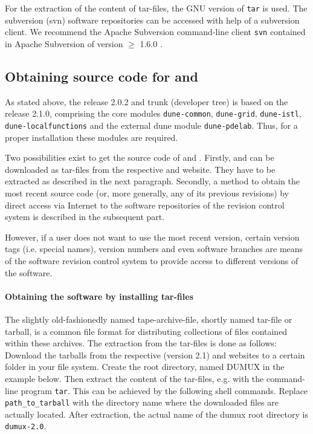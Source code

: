 For the extraction of the content of tar-files, the GNU version of \texttt{tar} is used.
The subversion (svn) software repositories can be accessed with help of a subversion client. We recommend the Apache Subversion command-line client \texttt{svn}
contained in Apache Subversion of version $\geqslant$ 1.6.0 \cite{APACHE-SUBVERSION-HP}. 

\subsection{Obtaining source code for \Dune and \Dumux}
As stated above, the \Dumux release 2.0.2 and trunk (developer tree) is based on the \Dune release 2.1.0, 
comprising the core modules \texttt{dune-common}, \texttt{dune-grid}, \texttt{dune-istl}, \texttt{dune-localfunctions} 
and the external dune module \texttt{dune-pdelab}. Thus, for a proper \Dumux installation these modules are required.

Two possibilities exist to get the source code of \Dune and \Dumux.
Firstly, \Dune and \Dumux can be downloaded as tar-files from the respective {\Dune} and {\Dumux} website. They have to be extracted as described in the next paragraph.
Secondly, a method to obtain the most recent source code (or, more generally, any of its previous revisions) by direct access 
via Internet to the software repositories of the revision control system is described in the subsequent part. 

However, if a user does not want to use the most recent version,
certain version tags (i.e. special names), version numbers and even software branches are means 
of the software revision control system to provide access to different versions of the software.

\paragraph{Obtaining the software by installing tar-files}
The slightly old-fashionedly named tape-archive-file, shortly named tar-file or tarball, is a common file format for distributing collections of files contained within these archives.
The extraction from the tar-files is done as follows: 
Download the tarballs from the respective \Dune (version 2.1) and \Dumux websites to a certain folder in your file system.
Create the {\Dune} root directory, named DUMUX in the example below. Then extract the content of the tar-files, e.g. with the command-line program \texttt{tar}.
This can be achieved by the following shell commands. Replace \texttt{path\_to\_tarball} with the directory name where the downloaded files are actually located.
After extraction, the actual name of the dumux root directory is \texttt{dumux-2.0}. 

